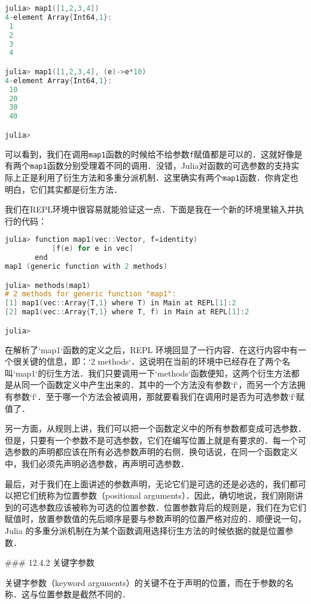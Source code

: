 \begin{lstlisting}[language=cpp]
julia> map1([1,2,3,4])
4-element Array{Int64,1}:
 1
 2
 3
 4

julia> map1([1,2,3,4], (e)->e*10)
4-element Array{Int64,1}:
 10
 20
 30
 40

julia> 
\end{lstlisting}

可以看到，我们在调用\verb|map1|函数的时候给不给参数\verb|f|赋值都是可以的．这就好像是有两个\verb|map1|函数分别受理着不同的调用．没错，Julia对函数的可选参数的支持实际上正是利用了衍生方法和多重分派机制．这里确实有两个\verb|map1|函数．你肯定也明白，它们其实都是衍生方法．

我们在REPL环境中很容易就能验证这一点．下面是我在一个新的环境里输入并执行的代码：

\begin{lstlisting}[language=cpp]
julia> function map1(vec::Vector, f=identity)
           [f(e) for e in vec]
       end
map1 (generic function with 2 methods)

julia> methods(map1)
# 2 methods for generic function "map1":
[1] map1(vec::Array{T,1} where T) in Main at REPL[1]:2
[2] map1(vec::Array{T,1} where T, f) in Main at REPL[1]:2

julia> 
\end{lstlisting}

在解析了`map1`函数的定义之后，REPL 环境回显了一行内容．在这行内容中有一个很关键的信息，即：`2 methods`．这说明在当前的环境中已经存在了两个名叫`map1`的衍生方法．我们只要调用一下`methods`函数便知，这两个衍生方法都是从同一个函数定义中产生出来的．其中的一个方法没有参数`f`，而另一个方法拥有参数`f`．至于哪一个方法会被调用，那就要看我们在调用时是否为可选参数`f`赋值了．

另一方面，从规则上讲，我们可以把一个函数定义中的所有参数都变成可选参数．但是，只要有一个参数不是可选参数，它们在编写位置上就是有要求的．每一个可选参数的声明都应该在所有必选参数声明的右侧．换句话说，在同一个函数定义中，我们必须先声明必选参数，再声明可选参数．

最后，对于我们在上面讲述的参数声明，无论它们是可选的还是必选的，我们都可以把它们统称为位置参数（positional arguments）．因此，确切地说，我们刚刚讲到的可选参数应该被称为可选的位置参数．位置参数背后的规则是，我们在为它们赋值时，放置参数值的先后顺序是要与参数声明的位置严格对应的．顺便说一句，Julia 的多重分派机制在为某个函数调用选择衍生方法的时候依据的就是位置参数．

### 12.4.2 关键字参数

关键字参数（keyword arguments）的关键不在于声明的位置，而在于参数的名称．这与位置参数是截然不同的．

